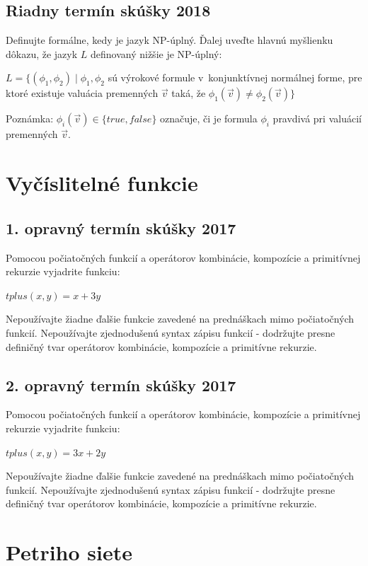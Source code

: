 \documentclass[11pt,a4paper]{article}
\begin{document}
		\subsection{Riadny termín skúšky 2018}

		Definujte formálne, kedy je jazyk NP-úplný. Ďalej uveďte hlavnú myšlienku dôkazu, že jazyk $L$ definovaný nižšie je NP-úplný:

		$L = \{(\phi_1, \phi_2) \mid \phi_1, \phi_2$ sú výrokové formule v~konjunktívnej normálnej forme, pre ktoré existuje valuácia premenných $\vec{v}$ taká, že $\phi_1(\vec{v}) \neq \phi_2(\vec{v})\}$

		Poznámka: $\phi_i(\vec{v}) \in \{true, false\}$ označuje, či je formula $\phi_i$ pravdivá pri valuácií premenných $\vec{v}$.

	\section{Vyčíslitelné funkcie}

		\subsection{1. opravný termín skúšky 2017}

		Pomocou počiatočných funkcií a operátorov kombinácie, kompozície a primitívnej rekurzie vyjadrite funkciu:

		$tplus(x,y) = x + 3y$

		Nepoužívajte žiadne ďalšie funkcie zavedené na prednáškach mimo počiatočných funkcií. Nepoužívajte zjednodušenú syntax zápisu funkcií \-- dodržujte presne definičný tvar operátorov kombinácie, kompozície a primitívne rekurzie.

		\subsection{2. opravný termín skúšky 2017}

		Pomocou počiatočných funkcií a operátorov kombinácie, kompozície a primitívnej rekurzie vyjadrite funkciu:

		$tplus(x,y) = 3x + 2y$

		Nepoužívajte žiadne ďalšie funkcie zavedené na prednáškach mimo počiatočných funkcií. Nepoužívajte zjednodušenú syntax zápisu funkcií \-- dodržujte presne definičný tvar operátorov kombinácie, kompozície a primitívne rekurzie.

	\section{Petriho siete}
\end{document}
